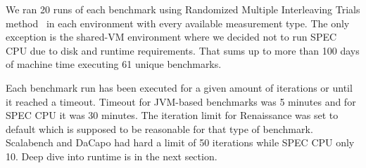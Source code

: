 \begin{table}[ht]
  \centering
  \caption{Summary of selected platforms.}
  \label{table:envs}
\end{table}

We ran 20 runs of each benchmark using Randomized Multiple Interleaving Trials method~\cite{abedi2017conducting} in each environment with every available measurement type.
The only exception is the \mbox{shared-VM} environment where we decided not to run SPEC CPU due to disk and runtime requirements.
That sums up to more than 100 days of machine time executing 61 unique benchmarks.

Each benchmark run has been executed for a given amount of iterations or until it reached a timeout.
Timeout for \mbox{JVM-based} benchmarks was 5 minutes and for SPEC CPU it was 30 minutes.
The iteration limit for Renaissance was set to default which is supposed to be reasonable for that type of benchmark.
Scalabench and DaCapo had hard a limit of 50 iterations while SPEC CPU only 10.
Deep dive into runtime is in the next section.

